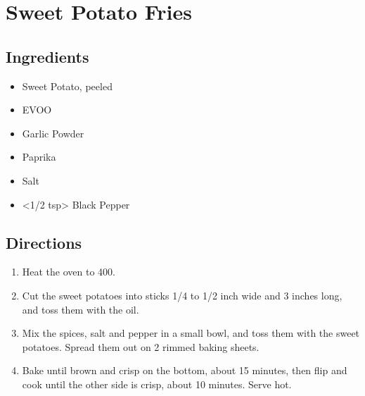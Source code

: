 \section{Sweet Potato Fries}

\subsection{ Ingredients }

\begin{itemize}
  \item <2 lbs> Sweet Potato, peeled
  \item <2 tbs> EVOO
  \item <1 tsp> Garlic Powder
  \item <1 tsp> Paprika
  \item <1 tsp> Salt
  \item <1/2 tsp> Black Pepper
\end{itemize}

\subsection{ Directions }

\begin{enumerate}
  \item Heat the oven to 400.
  \item Cut the sweet potatoes into sticks 1/4 to 1/2 inch wide and 3 inches long, and toss them with the oil.
  \item Mix the spices, salt and pepper in a small bowl, and toss them with the sweet potatoes. Spread them out on 2 rimmed baking sheets.
  \item Bake until brown and crisp on the bottom, about 15 minutes, then flip and cook until the other side is crisp, about 10 minutes. Serve hot.
\end{enumerate}
